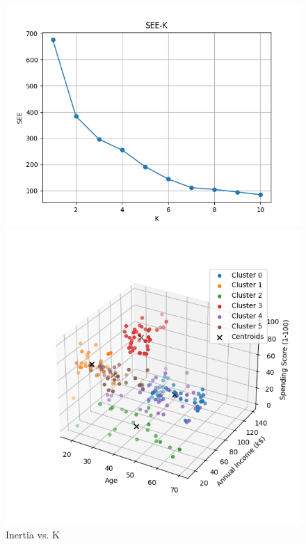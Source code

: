 \documentclass[8pt]{article}
\begin{document}
\begin{figure}[H]
    \centering
    \begin{minipage}{0.32\textwidth}
        \centering
        \includegraphics[width=\textwidth]{./Prob4/out/task3_1_com/SEE-K.png}
        \caption{Inertia vs. K}
        \label{fig: Inertia vs. K k6 com}
    \end{minipage}
    \hfill
    \begin{minipage}{0.32\textwidth}
        \centering
        \includegraphics[width=\textwidth]{./Prob4/out/task3_1_com/images/cluster_result_k6_3d.png}

\end{minipage}
\end{figure}
\end{document}
